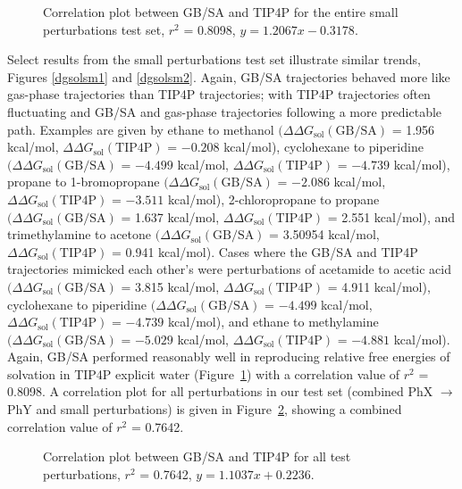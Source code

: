 \documentclass[12pt]{report}
\def\figlab{Figure}\def\figslab{\figlab s}
\newcommand*\fig[1]{\figlab~\ref{#1}}
\begin{document}
\begin{figure}[t!]
\centering

\caption{Correlation plot between GB/SA and TIP4P for the entire small perturbations test set, $r^2$ = 0.8098, $y = 1.2067x - 0.3178$.}
\label{corrsmall}
\end{figure}

Select results from the small perturbations test set illustrate similar trends, Figures \ref{dgsolsm1} and \ref{dgsolsm2}. Again, GB/SA trajectories behaved more like gas-phase trajectories than TIP4P trajectories; with TIP4P trajectories often fluctuating and GB/SA and gas-phase trajectories following a more predictable path. Examples are given by 
ethane to methanol 
$(\Delta\Delta G_{ \textrm{sol}}(\textrm{GB/SA})$ = 1.956 kcal/mol, 
$\Delta\Delta G_{ \textrm{sol}}(\textrm{TIP4P})$ = $-0.208$ kcal/mol), 
cyclohexane to piperidine 
$(\Delta\Delta G_{ \textrm{sol}}(\textrm{GB/SA})$ = $-4.499$ kcal/mol, 
$\Delta\Delta G_{ \textrm{sol}}(\textrm{TIP4P})$ = $-4.739$ kcal/mol), 
propane to 1-bromopropane 
$(\Delta\Delta G_{ \textrm{sol}}(\textrm{GB/SA})$ = $-2.086$ kcal/mol, 
$\Delta\Delta G_{ \textrm{sol}}(\textrm{TIP4P})$ = $-3.511$ kcal/mol), 
2-chloropropane to propane 
$(\Delta\Delta G_{ \textrm{sol}}(\textrm{GB/SA})$ = 1.637 kcal/mol, 
$\Delta\Delta G_{ \textrm{sol}}(\textrm{TIP4P})$ = 2.551 kcal/mol), 
and trimethylamine to acetone 
$(\Delta\Delta G_{ \textrm{sol}}(\textrm{GB/SA})$ = 3.50954 kcal/mol, 
$\Delta\Delta G_{ \textrm{sol}}(\textrm{TIP4P})$ = 0.941 kcal/mol). 
Cases where the GB/SA and TIP4P trajectories mimicked each other's were perturbations of 
acetamide to acetic acid 
$(\Delta\Delta G_{ \textrm{sol}}(\textrm{GB/SA})$ = 3.815 kcal/mol, 
$\Delta\Delta G_{ \textrm{sol}}(\textrm{TIP4P})$ = 4.911 kcal/mol), 
cyclohexane to piperidine 
$(\Delta\Delta G_{ \textrm{sol}}(\textrm{GB/SA})$ = $-4.499$ kcal/mol, 
$\Delta\Delta G_{ \textrm{sol}}(\textrm{TIP4P})$ = $-4.739$ kcal/mol), 
and ethane to methylamine 
$(\Delta\Delta G_{ \textrm{sol}}(\textrm{GB/SA})$ = $-5.029$ kcal/mol, 
$\Delta\Delta G_{ \textrm{sol}}(\textrm{TIP4P})$ = $-4.881$ kcal/mol). 
Again, GB/SA performed reasonably well in reproducing relative free energies of solvation in TIP4P explicit water (\fig{corrsmall}) with a correlation value of $r^2$ = 0.8098. A correlation plot for all perturbations in our test set (combined PhX $\longrightarrow$ PhY and small perturbations) is given in \fig{corrall}, showing a combined correlation value of $r^2$ = 0.7642.

\begin{figure}[t!]
\centering

\caption{Correlation plot between GB/SA and TIP4P for all test perturbations, $r^2$ = 0.7642, $y = 1.1037x + 0.2236$.}
\label{corrall}
\end{figure}
\end{document}
